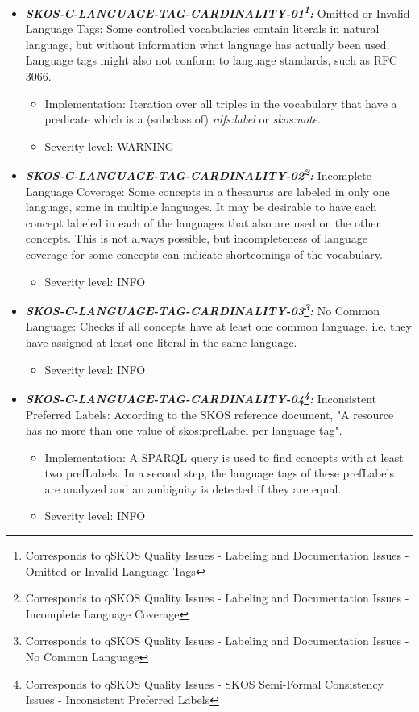 \documentclass{llncs}
\begin{document}
\begin{itemize}

	\item \textbf{{\em SKOS-C-LANGUAGE-TAG-CARDINALITY-01\footnote{Corresponds to qSKOS Quality Issues - Labeling and Documentation Issues - Omitted or Invalid Language Tags}:}}
	Omitted or Invalid Language Tags:
Some controlled vocabularies contain literals in natural language, but without information what language has actually been used. Language tags might also not conform to language standards, such as RFC 3066. 
\begin{itemize}
	\item Implementation: Iteration over all triples in the vocabulary that have a predicate which is a (subclass of) \emph{rdfs:label} or \emph{skos:note}. 
  \item Severity level: WARNING
\end{itemize}

  \item \textbf{{\em SKOS-C-LANGUAGE-TAG-CARDINALITY-02\footnote{Corresponds to qSKOS Quality Issues - Labeling and Documentation Issues - Incomplete Language Coverage}:}}
	Incomplete Language Coverage:
	Some concepts in a thesaurus are labeled in only one language, some in multiple languages. It may be desirable to have each concept labeled in each of the languages that also are used on the other concepts. This is not always possible, but incompleteness of language coverage for some concepts can indicate shortcomings of the vocabulary. 
	\begin{itemize}
		\item Severity level: INFO
	\end{itemize}
	
	\item \textbf{{\em SKOS-C-LANGUAGE-TAG-CARDINALITY-03\footnote{Corresponds to qSKOS Quality Issues - Labeling and Documentation Issues - No Common Language}:}}
	No Common Language:
	Checks if all concepts have at least one common language, i.e. they have assigned at least one literal in the same language. 
	\begin{itemize}
		\item Severity level: INFO
	\end{itemize}
	
	\item \textbf{{\em SKOS-C-LANGUAGE-TAG-CARDINALITY-04\footnote{Corresponds to qSKOS Quality Issues - SKOS Semi-Formal Consistency Issues - Inconsistent Preferred Labels}:}}
	Inconsistent Preferred Labels:
  According to the SKOS reference document, "A resource has no more than one value of skos:prefLabel per language tag".  
	\begin{itemize}
	  \item Implementation:
		A SPARQL query is used to find concepts with at least two prefLabels. In a second step, the language tags of these prefLabels are analyzed and an ambiguity is detected if they are equal.  
		\item Severity level: INFO
	\end{itemize}
	
\end{itemize}
\end{document}
